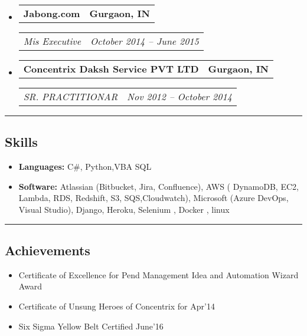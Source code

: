 \documentclass[11pt,letterpaper]{article}
\makeatletter
\newcommand{\headerrow}[2]
{\begin{tabular*}{\linewidth}{l@{\extracolsep{\fill}}r}
#1 &
#2 \\
\end{tabular*}}
\makeatother
\begin{document}
\begin{itemize}[leftmargin=1em]
	\item
	      \headerrow
	      {\textbf{Jabong.com}}
	      {\textbf{Gurgaon, IN}}
	      \headerrow
	      {\emph{Mis Executive}}
	      {\emph{October 2014 -- June 2015}}
	\item
	      \headerrow
	      {\textbf{Concentrix Daksh Service PVT LTD}}
	      {\textbf{Gurgaon, IN}}
	      \headerrow
	      {\emph{SR. PRACTITIONAR}}
	      {\emph{Nov 2012 -- October 2014}}
	      	      
\end{itemize}

\hrule
\vspace{-1em}
\subsection*{\Large Skills}

\begin{itemize}[leftmargin=1em,noitemsep]
	\item \textbf{Languages:}
	      C\#, Python,VBA SQL
	\item \textbf{Software:}
	      Atlassian (Bitbucket, Jira, Confluence), AWS ( DynamoDB, EC2, Lambda, RDS, Redshift, S3, SQS,Cloudwatch), Microsoft (Azure DevOps, Visual Studio),  Django, Heroku, Selenium , Docker , linux
\end{itemize}

\hrule
\vspace{-1em}
\subsection*{\Large Achievements}

\begin{itemize}[leftmargin=1em,noitemsep]
	\item Certificate of Excellence for Pend Management Idea and Automation Wizard Award
	\item Certificate of Unsung Heroes of Concentrix for Apr’14
	\item Six Sigma Yellow Belt Certified June’16
\end{itemize}
\end{document}
